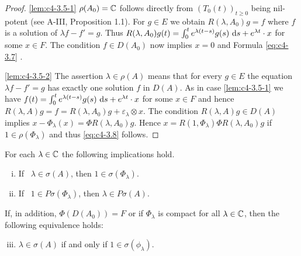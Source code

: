 \begin{proof}
\ref{lem:c4-3.5-1}
$\rho(A_{0}) = \mathbb{C}$ follows directly from $(T_{0}(t))_{t \geq 0}$ being nil-potent (see A-III, Proposition 1.1). For $g \in E$ we obtain $R(\lambda,A_{0})g = f$ where $f$ is a solution of $\lambda f - f' = g$.
Thus $R(\lambda,A_{0})g(t) = \int_{0}^{t} e^{\lambda(t-s)}g(s)\, \mathop{}\!\mathrm{d}{s} + e^{\lambda t} \cdot x$ for some $x \in F$. The condition $f \in D(A_{0})$ now implies $x = 0$ and Formula \eqref{eq:c4-3.7}  .

\ref{lem:c4-3.5-2}
The assertion $\lambda \in \rho(A)$ means that for every $g \in E$ the equation $\lambda f - f' = g$ has exactly one solution $f$ in $D(A)$. As in case \ref{lem:c4-3.5-1} we have 
$f(t) = \int_{0}^{t} e^{\lambda(t-s)}g(s)\, \mathop{}\!\mathrm{d}{s} + e^{\lambda t} \cdot x$ for some $x \in F$ and hence
$R(\lambda,A)g = f = R(\lambda,A_{0})g + \varepsilon_{\lambda}  \otimes x$. 
The condition $R(\lambda,A)g \in D(A)$ implies $x - \Phi_{\lambda}(x) = \Phi R(\lambda,A_{0})g$. 
Hence $x = R(1,\Phi_{\lambda})\Phi R(\lambda,A_{0})g$ if $1 \in \rho(\Phi_{\lambda})$ and thus \eqref{eq:c4-3.8} follows.
\end{proof}

\begin{proposition}\label{prop:c4-3.6}
For each $\lambda \in \mathbb{C}$ the following implications hold.
\begin{enumerate}[(i)]
\item \label{prop:c4-3.6-1}
If \, $\lambda \in \sigma(A)$, then $1 \in \sigma(\Phi_{\lambda})$.
\item \label{prop:c4-3.6-2}
If \, $1 \in P\sigma(\Phi_{\lambda})$, then $\lambda \in P\sigma(A)$.
\end{enumerate}
If, in addition, $\Phi(D(A_{0})) = F$ or if $\Phi_{\lambda}$ is compact for all $\lambda \in \mathbb{C}$, then the following equivalence holds:
\begin{enumerate}[(i)]
\setcounter{enumi}{2}
\item \label{prop:c4-3.6-3}
$\lambda \in \sigma(A)$ if and only if $1 \in \sigma(\phi_{\lambda})$.
\end{enumerate}
\end{proposition}

